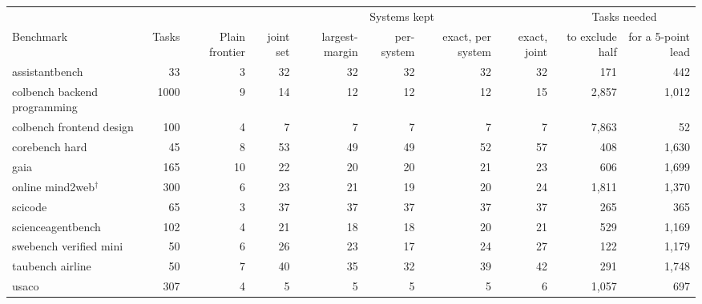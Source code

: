 \begin{tabular}{lrrrrrrrrr}
\toprule
 & & & \multicolumn{5}{c}{Systems kept} & \multicolumn{2}{c}{Tasks needed} \\
Benchmark & Tasks & Plain frontier & joint set & largest-margin & per-system & exact, per system & exact, joint & to exclude half & for a 5-point lead \\
\midrule
assistantbench & 33 & 3 & 32 & 32 & 32 & 32 & 32 & 171 & 442 \\
colbench backend programming & 1000 & 9 & 14 & 12 & 12 & 12 & 15 & 2,857 & 1,012 \\
colbench frontend design & 100 & 4 & 7 & 7 & 7 & 7 & 7 & 7,863 & 52 \\
corebench hard & 45 & 8 & 53 & 49 & 49 & 52 & 57 & 408 & 1,630 \\
gaia & 165 & 10 & 22 & 20 & 20 & 21 & 23 & 606 & 1,699 \\
online mind2web$^{\dagger}$ & 300 & 6 & 23 & 21 & 19 & 20 & 24 & 1,811 & 1,370 \\
scicode & 65 & 3 & 37 & 37 & 37 & 37 & 37 & 265 & 365 \\
scienceagentbench & 102 & 4 & 21 & 18 & 18 & 20 & 21 & 529 & 1,169 \\
swebench verified mini & 50 & 6 & 26 & 23 & 17 & 24 & 27 & 122 & 1,179 \\
taubench airline & 50 & 7 & 40 & 35 & 32 & 39 & 42 & 291 & 1,748 \\
usaco & 307 & 4 & 5 & 5 & 5 & 5 & 6 & 1,057 & 697 \\
\bottomrule
\end{tabular}
